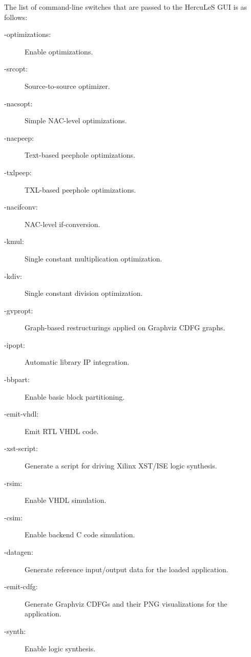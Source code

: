 \documentclass[a4paper]{article}
\begin{document}
The list of command-line switches that are passed to the HercuLeS GUI is as follows:
%
\begin{description}
\item[{-optimizations:}] \leavevmode 
Enable optimizations.

\item[{-srcopt:}] \leavevmode 
Source-to-source optimizer.

\item[{-nacsopt:}] \leavevmode 
Simple NAC-level optimizations.

\item[{-nacpeep:}] \leavevmode 
Text-based peephole optimizations.

\item[{-txlpeep:}] \leavevmode 
TXL-based peephole optimizations.

\item[{-nacifconv:}] \leavevmode 
NAC-level if-conversion.

\item[{-kmul:}] \leavevmode 
Single constant multiplication optimization.

\item[{-kdiv:}] \leavevmode 
Single constant division optimization.

\item[{-gvpropt:}] \leavevmode 
Graph-based restructurings applied on Graphviz CDFG graphs.

\item[{-ipopt:}] \leavevmode 
Automatic library IP integration.

\item[{-bbpart:}] \leavevmode 
Enable basic block partitioning.

\item[{-emit-vhdl:}] \leavevmode 
Emit RTL VHDL code.

\item[{-xst-script:}] \leavevmode 
Generate a script for driving Xilinx XST/ISE logic synthesis.

\item[{-rsim:}] \leavevmode 
Enable VHDL simulation.

\item[{-csim:}] \leavevmode 
Enable backend C code simulation.

\item[{-datagen:}] \leavevmode 
Generate reference input/output data for the loaded application.

\item[{-emit-cdfg:}] \leavevmode 
Generate Graphviz CDFGs and their PNG visualizations for the application.

\item[{-synth:}] \leavevmode 
Enable logic synthesis.

\end{description}
\end{document}
